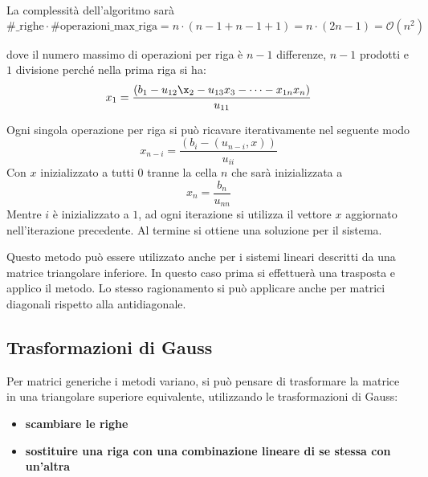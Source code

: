 La complessità dell'algoritmo sarà
\begin{equation*}
    \text{\#_righe}\cdot \text{\#operazioni\_max\_riga} = n\cdot (n-1 + n-1 +1 ) = n\cdot (2n-1) = \mathcal{O}(n^2)
\end{equation*}
\begin{nota}
    dove il numero massimo di operazioni per riga è $n-1$ differenze, $n-1$ prodotti
    e $1$ divisione perché nella prima riga si ha:
    \begin{equation*}
        x_1 = \frac{(b_1-u_{12}\x_2 - u_{13}x_3-\dots -x_{1n}x_n)}{u_{11}} 
    \end{equation*}
\end{nota}

Ogni singola operazione per riga si può ricavare iterativamente nel seguente modo
\begin{equation*}
    x_{n-i} = \frac{(b_i-(u_{n-i},x))}{u_{ii}} 
\end{equation*}
Con $x$ inizializzato a tutti $0$ tranne la cella $n$ che sarà 
inizializzata a 
\begin{equation*}
    x_n = \frac{b_n}{u_{nn}}
\end{equation*}
Mentre $i$ è inizializzato a $1$, ad ogni iterazione si utilizza il vettore $x$ 
aggiornato nell'iterazione precedente. Al termine si ottiene una soluzione per il 
sistema. 

\begin{nota}
    Questo metodo può essere utilizzato anche per i sistemi lineari descritti da 
    una matrice triangolare inferiore. In questo caso prima si effettuerà una 
    trasposta e applico il metodo. Lo stesso ragionamento si può applicare anche 
    per matrici diagonali rispetto alla antidiagonale. 
\end{nota}

\subsection{Trasformazioni di Gauss}
Per matrici generiche i metodi variano, si può pensare di trasformare la matrice 
in una triangolare superiore equivalente, utilizzando le trasformazioni di Gauss:
\begin{itemize}
    \item \textbf{scambiare le righe}
    \item \textbf{sostituire una riga con una combinazione lineare di se stessa con un'altra}
\end{itemize}